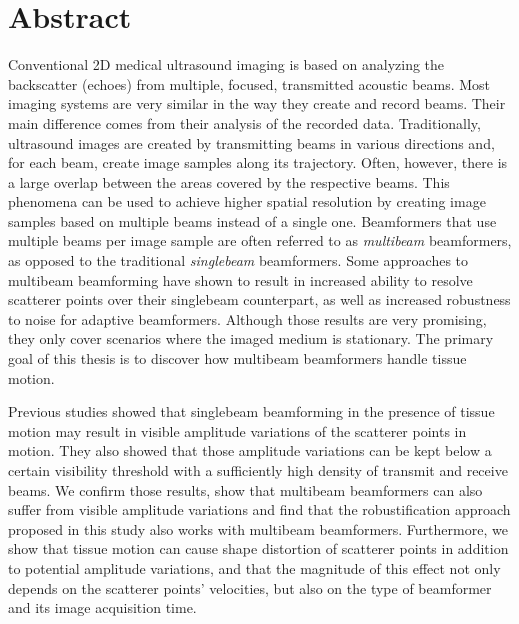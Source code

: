 
\chapter*{Abstract}
Conventional 2D medical ultrasound imaging is based on analyzing the backscatter 
(echoes) from multiple, focused, transmitted acoustic beams.
Most imaging systems are very similar in the way they create and record beams. Their main difference comes from their analysis of the recorded data.
Traditionally, ultrasound images are created by transmitting beams in various directions and, for each beam, create image samples along its trajectory.
Often, however, there is a large overlap between the areas covered by the respective beams.
This phenomena can be used to achieve higher spatial resolution by creating image samples based on multiple beams instead of a single one.
Beamformers that use multiple beams per image sample are often referred to as \textit{multibeam} beamformers, as opposed to the traditional \textit{singlebeam} beamformers.
Some approaches to multibeam beamforming have shown to result in increased ability to resolve scatterer points over their singlebeam counterpart, as well as increased robustness to noise for adaptive beamformers.
Although those results are very promising, they only cover scenarios where the imaged medium is stationary.
The primary goal of this thesis is to discover how multibeam beamformers handle tissue motion.

Previous studies showed that singlebeam beamforming in the presence of tissue motion may result in visible amplitude variations of the scatterer points in motion. 
They also showed that those amplitude variations can be kept below a certain visibility threshold with a sufficiently high density of transmit and receive beams.
We confirm those results, show that multibeam beamformers can also suffer from visible amplitude variations and find that the robustification approach proposed in this study also works with multibeam beamformers.
Furthermore, we show that tissue motion can cause shape distortion of scatterer points in addition to potential amplitude variations, and that the magnitude of this effect not only depends on the scatterer points' velocities, but also on the type of beamformer and its image acquisition time.

